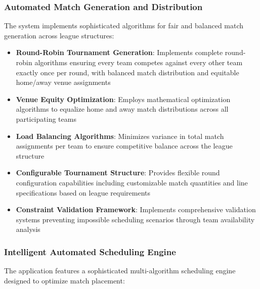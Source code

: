 \subsubsection{Automated Match Generation and Distribution}
The system implements sophisticated algorithms for fair and balanced match generation across league structures:

\begin{itemize}
    \item \textbf{Round-Robin Tournament Generation}: Implements complete round-robin algorithms ensuring every team competes against every other team exactly once per round, with balanced match distribution and equitable home/away venue assignments
    \item \textbf{Venue Equity Optimization}: Employs mathematical optimization algorithms to equalize home and away match distributions across all participating teams
    \item \textbf{Load Balancing Algorithms}: Minimizes variance in total match assignments per team to ensure competitive balance across the league structure
    \item \textbf{Configurable Tournament Structure}: Provides flexible round configuration capabilities including customizable match quantities and line specifications based on league requirements
    \item \textbf{Constraint Validation Framework}: Implements comprehensive validation systems preventing impossible scheduling scenarios through team availability analysis
\end{itemize}

\subsubsection{Intelligent Automated Scheduling Engine}
The application features a sophisticated multi-algorithm scheduling engine designed to optimize match placement:

